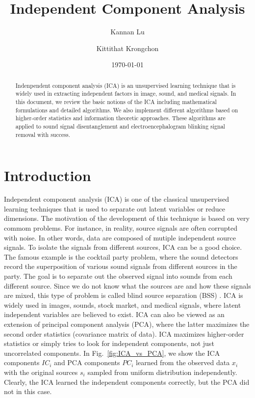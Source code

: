 \documentclass[aps,prl,preprint,superscriptaddress]{revtex4-2}
\begin{document}
\title{Independent Component Analysis}

\author{Kannan Lu}
\author{Kittithat Krongchon}

\date{\today}

\begin{abstract}
Indenpendent component analysis (ICA) is an unsupervised learning technique that is widely used in extracting independent factors in image, sound, and medical signals. In this document, we review the basic notions of the ICA including mathematical formulations and detailed algorithms. We also implement different algorithms based on higher-order statistics and information theoretic approaches. These algorithms are applied to sound signal disentanglement and electroencephalogram blinking signal removal with success.
\end{abstract}

\maketitle

\section{Introduction}
Independent component analysis (ICA) is one of the classical unsupervised learning techniques that is used to separate out latent variables or reduce dimensions. The motivation of the development of this technique is based on very commom problems. For instance, in reality, source signals are often corrupted with noise. In other words, data are composed of mutiple independent source signals. To isolate the signals from different sources, ICA can be a good choice. The famous example is the cocktail party problem, where the sound detectors record the superposition of various sound signals from different sources in the party. The goal is to separate out the observed signal into sounds from each different source. Since we do not know what the sources are and how these signals are mixed, this type of problem is called blind source separation (BSS) \cite{lee1998independent}. ICA is widely used in images, sounds, stock market, and medical signals, where latent independent variables are believed to exist. ICA can also be viewed as an extension of principal component analysis (PCA), where the latter maximizes the second order statistics (covariance matrix of data). ICA maximizes higher-order statistics or simply tries to look for independent components, not just uncorrelated components. In Fig.~\ref{fig:ICA_vs_PCA}, we show the ICA components $IC_{i}$ and PCA components $PC_{i}$ learned from the observed data $x_{i}$ with the original sources $s_{i}$ sampled from uniform distribution independently. Clearly, the ICA learned the independent components correctly, but the PCA did not in this case.
\end{document}
